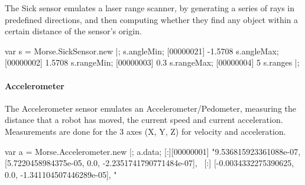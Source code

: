 The Sick sensor emulates a laser range scanner, by generating a series of
rays in predefined directions, and then computing whether they find any
object within a certain distance of the sensor’s origin.

\begin{urbiunchecked}
var s = Morse.SickSensor.new |;
s.angleMin;
[00000021] -1.5708
s.angleMax;
[00000002] 1.5708
s.rangeMin;
[00000003] 0.3
s.rangeMax;
[00000004] 5
s.ranges |;
\end{urbiunchecked}

\paragraph{Accelerometer}

The Accelerometer sensor emulates an Accelerometer/Pedometer, measuring the
distance that a robot has moved, the current speed and current
acceleration. Measurements are done for the 3 axes (X, Y, Z) for velocity
and acceleration.

\begin{urbiunchecked}
var a = Morse.Accelerometer.new |;
a.data;
[:][00000001] "9.536815923361088e-07, [5.7220458984375e-05, 0.0, -2.2351741790771484e-07], \
[:]                                   [-0.0034332275390625, 0.0, -1.341104507446289e-05], "
\end{urbiunchecked}


